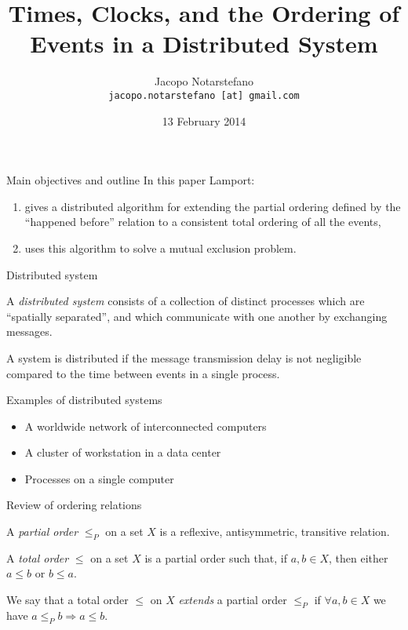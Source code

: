 \documentclass[12pt]{beamer}
\title[Times, Clocks and the ordering of Events]{Times, Clocks, and the Ordering of Events in a Distributed System}
\author[Jacopo Notarstefano]{
    Jacopo Notarstefano\\
    \texttt{jacopo.notarstefano [at] gmail.com}
}
\date{13 February 2014}
\begin{document}
    \begin{frame}[plain]
        \titlepage
    \end{frame}

    \begin{frame}{Main objectives and outline}
        In this paper Lamport:
        \begin{enumerate}
            \item gives a distributed algorithm for extending the partial
            ordering defined by the ``happened before'' relation to a consistent
            total ordering of all the events,
            \item uses this algorithm to solve a mutual exclusion problem.
        \end{enumerate}
    \end{frame}

    \begin{frame}{Distributed system}
        \begin{definition}
            A \emph{distributed system} consists of a collection of distinct processes
            which are ``spatially separated'', and which communicate with one another
            by exchanging messages.

            A system is distributed if the message transmission delay is not
            negligible compared to the time between events in a single process.
        \end{definition}
    \end{frame}

    \begin{frame}{Examples of distributed systems}
        \begin{itemize}
            \item A worldwide network of interconnected computers
            \item A cluster of workstation in a data center
            \item Processes on a single computer
        \end{itemize}
    \end{frame}

    \begin{frame}{Review of ordering relations}
        \begin{definition}
            A \emph{partial order} \(\le_{P}\) on a set \(X\) is a reflexive, antisymmetric,
            transitive relation.
        \end{definition}
        \begin{definition}
            A \emph{total order} \(\le\) on a set \(X\) is a partial order such that, if
            \(a,b\in X\), then either \(a\le b\) or \(b\le a\).
        \end{definition}
        \begin{definition}
            We say that a total order \(\le\) on \(X\) \emph{extends} a partial order
            \(\le_{P}\) if \(\forall a,b\in X\) we have \(a\le_{P}b\Rightarrow a\le b\).
        \end{definition}
    \end{frame}
\end{document}
